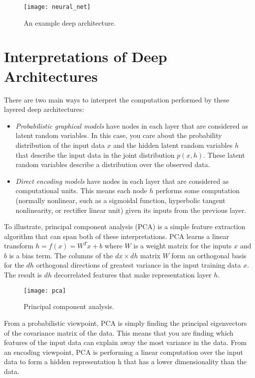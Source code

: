 \begin{figure}[h!]
  \centering
    \texttt{[image: neural\_net]}
\caption{An example deep architecture.}
\end{figure}

\section{Interpretations of Deep Architectures}
There are two main ways to interpret the computation performed by these layered deep architectures:

\begin{itemize}
\item \emph{Probabilistic graphical models} have nodes in each layer that are considered as latent random variables. In this case, you care about the probability distribution of the input data \(x\) and the hidden latent random variables \(h\) that describe the input data in the joint distribution \(p(x,h)\). These latent random variables describe a distribution over the observed data.
\item \emph{Direct encoding models} have nodes in each layer that are considered as computational units. This means each node \(h\) performs some computation (normally nonlinear, such as a sigmoidal function, hyperbolic tangent nonlinearity, or rectifier linear unit) given its inputs from the previous layer.
\end{itemize}

To illustrate, principal component analysis (PCA) is a simple feature extraction algorithm that can span both of these interpretations. PCA learns a linear transform \(h = f(x) = W^T x + b\) where \(W\) is a weight matrix for the inputs \(x\) and \(b\) is a bias term. The columns of the \(dx \times dh\) matrix \(W\) form an orthogonal basis for the \(dh\) orthogonal directions of greatest variance in the input training data \(x\). The result is \(dh\) decorrelated features that make representation layer \(h\). 

\begin{figure}[h!]
  \centering
    \texttt{[image: pca]}
\caption{Principal component analysis.}
\end{figure}

From a probabilistic viewpoint, PCA is simply finding the principal eigenvectors of the covariance matrix of the data. This means that you are finding which features of the input data can explain away the most variance in the data\cite{bach05}. From an encoding viewpoint, PCA is performing a linear computation over the input data to form a hidden representation h that has a lower dimensionality than the data.


